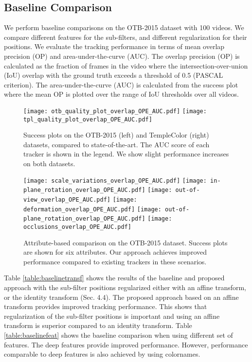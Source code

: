 \documentclass[runningheads,a4paper]{llncs}
\begin{document}
\subsection{Baseline Comparison}
We perform baseline comparisons on the OTB-2015 dataset with 100 videos. We compare different features for the sub-filters, and different regularization for their positions. We evaluate the tracking performance in terms of mean overlap precision (OP) and area-under-the-curve (AUC). The overlap precision (OP) is calculated as the fraction of frames in the video where the intersection-over-union (IoU) overlap with the ground truth exceeds a threshold of 0.5 (PASCAL criterion). The area-under-the-curve (AUC) is calculated from the success plot where the mean OP is plotted over the range of IoU thresholds over all videos.

\begin{figure}[!t]
  \centering
  \texttt{[image: otb\_quality\_plot\_overlap\_OPE\_AUC.pdf]}%
  \texttt{[image: tpl\_quality\_plot\_overlap\_OPE\_AUC.pdf]}
  \caption{Success plots on the OTB-2015 (left) and TempleColor (right) datasets, compared to state-of-the-art. The AUC score of each tracker is shown in the legend. We show slight performance increases on both datasets.}
  \label{fig:results}
\end{figure}\begin{figure}[!t]
  \centering
  \texttt{[image: scale\_variations\_overlap\_OPE\_AUC.pdf]}%
  \texttt{[image: in-plane\_rotation\_overlap\_OPE\_AUC.pdf]}%
  \texttt{[image: out-of-view\_overlap\_OPE\_AUC.pdf]}
  \texttt{[image: deformation\_overlap\_OPE\_AUC.pdf]}%
  \texttt{[image: out-of-plane\_rotation\_overlap\_OPE\_AUC.pdf]}%
  \texttt{[image: occlusions\_overlap\_OPE\_AUC.pdf]}
  \caption{Attribute-based comparison on the OTB-2015 dataset. Success plots are shown for six attributes. Our approach achieves improved performance compared to existing trackers in these scenarios.}
  \label{fig:attribute}
\end{figure}Table \ref{table:baselinetransf} shows the results of the baseline and proposed approach with the sub-filter positions regularized either with an affine transform, or the identity transform (Sec. 4.4). The proposed approach based on an affine transform provides improved tracking performance. This shows that regularization of the sub-filter positions is important and using an affine transform is superior compared to an identity transform. Table \ref{table:baselinefeat} shows the baseline comparison when using different set of features. The deep features provide improved performance. However, performance comparable to deep features is also achieved by using colornames.
\end{document}
